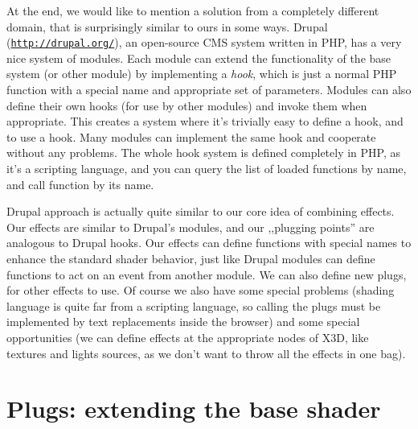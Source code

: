 \documentclass{acmsiggraph}                     %
\newcommand*{\myhref}[2]{\texttt{\href{#1}{\nolinkurl{#2}}}}
\begin{document}
At the end, we would like to mention a solution from a completely
different domain, that is surprisingly similar to ours in some ways.
Drupal (\myhref{http://drupal.org/}{http://drupal.org/}),
an open-source CMS system written in PHP,
has a very nice system of modules. Each module
can extend the functionality of the base system (or other module)
by implementing a \textit{hook}, which is just a normal PHP function
with a special name and appropriate set of parameters. Modules can also define
their own hooks (for use by other modules) and invoke them when appropriate.
This creates a system where it's trivially easy to define a hook,
and to use a hook.
Many modules can implement the same hook and cooperate without any problems.
The whole hook system is defined completely in PHP, as it's a scripting
language, and you can query the list of loaded functions by name,
and call function by its name.

Drupal approach is actually quite similar to our
core idea of combining effects. Our effects are similar to
Drupal's modules, and our ,,plugging points'' are analogous to Drupal hooks.
Our effects can define functions with special names to enhance
the standard shader behavior, just like Drupal modules can define functions
to act on an event from another module.
We can also define new plugs, for other effects to use.
Of course we also have some special problems
(shading language is quite far from a scripting language,
so calling the plugs must be implemented by text replacements inside the browser)
and some special opportunities (we can define effects at
the appropriate nodes of X3D, like textures and lights sources,
as we don't want to throw all the effects in one bag).

%
%

\section{Plugs: extending the base shader}
\end{document}
